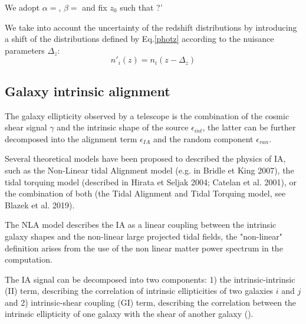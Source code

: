 \documentclass[twocolumn,twocolappendix]{aastex63}
\begin{document}
 We adopt  $\alpha=$, $\beta =$ and fix $z_0$ such that ?'

 We take into account the uncertainty of the redshift distributions by introducing  a shift of the distributions defined by Eq.\ref{photz} according to the nuisance parameters $\Delta_z$:
 \begin{equation}
     n'_i(z)= n_i(z-\Delta_z)
 \end{equation}

\subsection{Galaxy intrinsic alignment}

The galaxy ellipticity observed by a telescope is the combination of the cosmic shear signal $\gamma$ and the intrinsic shape of the source $\epsilon_{int}$, the latter can be further decomposed into the alignment term $\epsilon_{IA}$ and the random component $\epsilon_{ran}$. 

Several theoretical models have been proposed to described the physics of IA, such as the Non-Linear tidal Alignment model (e.g. in Bridle et King 2007), the tidal torquing model (described in Hirata et Seljak 2004; Catelan et al. 2001), or the combination of both (the Tidal Alignment and Tidal Torquing model, see Blazek et al. 2019).

The NLA model describes the IA as a linear coupling between the intrinsic galaxy shapes and the non-linear large projected tidal fields, the "non-linear" definition arises from the use of the non linear matter power spectrum in the computation. 

The IA signal can be decomposed into two components: 1) the intrinsic-intrinsic (II) term, describing the correlation of intrinsic ellipticities of two galaxies $i$ and $j$ and 2) intrinsic-shear coupling (GI) term, describing the correlation between the intrinsic ellipticity of one galaxy with the shear of another galaxy (\cite{kilbinger2015cosmology}).
\end{document}

